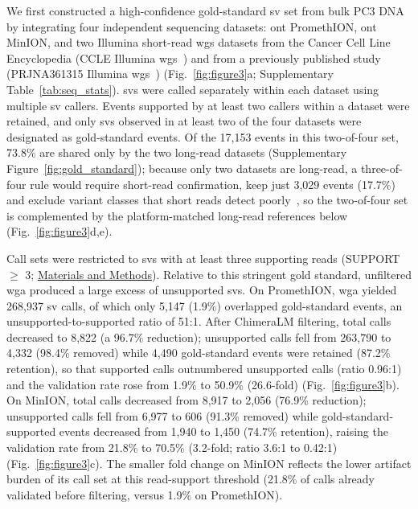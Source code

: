 \documentclass[pdflatex,lineno]{sn-jnl}%
\newif\ifrevisedtext
\newcommand{\chg}[1]{\ifrevisedtext\textcolor{revcolor}{#1}\else#1\fi}
\begin{document}
We first constructed a high-confidence gold-standard \gls{sv} set from bulk PC3 DNA by integrating four independent sequencing datasets: \gls{ont} PromethION, \gls{ont} MinION, and two Illumina short-read \gls{wgs} datasets from the Cancer Cell Line Encyclopedia (CCLE Illumina \gls{wgs}~\cite{barretina2012cancer}) and from a previously published study (PRJNA361315 Illumina \gls{wgs}~\cite{seim2017wholegenome}) (Fig.~\ref{fig:figure3}a; Supplementary Table~\ref{tab:seq_stats}).
\glspl{sv} were called separately within each dataset using multiple \gls{sv} callers.
Events supported by at least two callers within a dataset were retained, and only \glspl{sv} observed in at least two of the four datasets were designated as gold-standard events.
\chg{Of the 17,153 events in this two-of-four set, 73.8\% are shared only by the two long-read datasets (Supplementary Figure~\ref{fig:gold_standard}); because only two datasets are long-read, a three-of-four rule would require short-read confirmation, keep just 3,029 events (17.7\%) and exclude variant classes that short reads detect poorly~\cite{Sedlazeck2018}, so the two-of-four set is complemented by the platform-matched long-read references below (Fig.~\ref{fig:figure3}d,e).}

\chg{Call sets were restricted to \glspl{sv} with at least three supporting reads (SUPPORT $\geq$ 3; \hyperref[sec:methods]{Materials and Methods}).
	Relative to this stringent gold standard, unfiltered \gls{wga} produced a large excess of unsupported \glspl{sv}.
	On PromethION, \gls{wga} yielded 268,937 \gls{sv} calls, of which only 5,147 (1.9\%) overlapped gold-standard events, an unsupported-to-supported ratio of 51:1.
	After ChimeraLM filtering, total calls decreased to 8,822 (a 96.7\% reduction); unsupported calls fell from 263,790 to 4,332 (98.4\% removed) while 4,490 gold-standard events were retained (87.2\% retention), so that supported calls outnumbered unsupported calls (ratio 0.96:1) and the validation rate rose from 1.9\% to 50.9\% (26.6-fold) (Fig.~\ref{fig:figure3}b).
	On MinION, total calls decreased from 8,917 to 2,056 (76.9\% reduction); unsupported calls fell from 6,977 to 606 (91.3\% removed) while gold-standard-supported events decreased from 1,940 to 1,450 (74.7\% retention), raising the validation rate from 21.8\% to 70.5\% (3.2-fold; ratio 3.6:1 to 0.42:1) (Fig.~\ref{fig:figure3}c).
	The smaller fold change on MinION reflects the lower artifact burden of its call set at this read-support threshold (21.8\% of calls already validated before filtering, versus 1.9\% on PromethION).}
\end{document}
